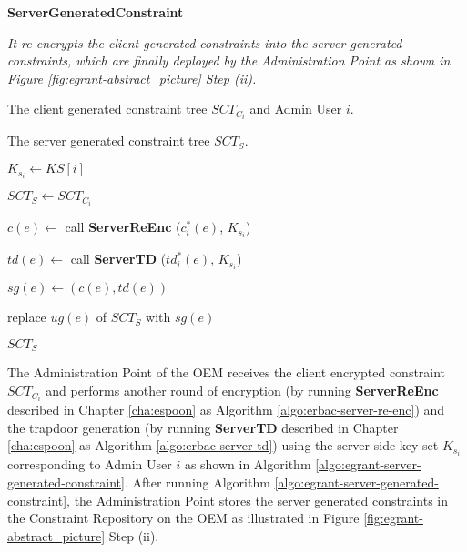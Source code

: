 \documentclass[epsfig,a4paper,11pt,titlepage]{book}
\numberwithin{algorithm}{chapter}
\newcommand{\algofontsize}{\fontsize{11}{12}\selectfont}
\begin{document}
\begin{algorithm} [htp]
{\algofontsize
\caption{\textbf{ServerGeneratedConstraint}}

\label{algo:egrant-server-generated-constraint}

\begin{algorithmic}[1]

\INPUT \emph{It re-encrypts the client generated constraints into the server generated constraints, which are finally deployed by the Administration Point as shown in Figure \ref{fig:egrant-abstract_picture} Step (ii).}

\Require The client generated constraint tree $SCT_{C_i}$ and Admin User $i$.

\Ensure The server generated constraint tree $SCT_{S}$.

\medskip

\State $K_{s_i} \leftarrow KS[i]$ {\algofontsize {}}

\State $SCT_{S} \leftarrow SCT_{C_i}$


	\State $c(e) \leftarrow$ call \textbf{ServerReEnc} ($c^*_i (e)$, $K_{s_i}$)
	
	\State $td(e) \leftarrow$ call \textbf{ServerTD} ($td^*_i (e)$, $K_{s_i}$)
	
	\State $sg(e) \leftarrow (c(e), td(e))$

	\State replace $ug(e)$ of $SCT_{S}$ with $sg(e)$

\EndFor

\Return $SCT_{S}$

\end{algorithmic}
}
\end{algorithm}


The Administration Point of the \gls{OEM} receives the client encrypted constraint $SCT_{C_i}$ and performs another round of encryption (by running \textbf{ServerReEnc} described in Chapter \ref{cha:espoon} as Algorithm \ref{algo:erbac-server-re-enc}) and the trapdoor generation (by running \textbf{ServerTD} described in Chapter \ref{cha:espoon} as Algorithm \ref{algo:erbac-server-td}) using the server side key set $K_{s_i}$ corresponding to Admin User $i$ as shown in Algorithm \ref{algo:egrant-server-generated-constraint}. After running Algorithm \ref{algo:egrant-server-generated-constraint}, the Administration Point stores the server generated constraints in the Constraint Repository on the \gls{OEM} as illustrated in Figure \ref{fig:egrant-abstract_picture} Step (ii).
\end{document}

